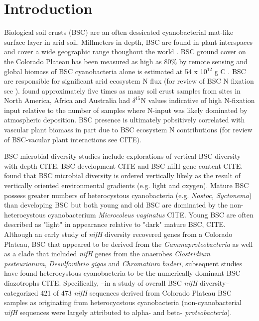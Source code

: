 \section{Introduction}


Biological soil crusts (BSC) are an often dessicated cyanobacterial mat-like surface layer in arid soil. Millmeters in depth, BSC are found in plant interspaces and cover a wide geographic range thoughout the world \cite{garcia2003estimates}. BSC ground cover on the Colorado Plateau has been measured as high as 80\% by remote sensing \cite{karnieli2001} and global biomass of BSC cyanobacteria alone is estimated at 54 x 10$^{12}$ g C \cite{garcia2003estimates}. BSC are responsible for significant arid ecosystem N flux (for review of BSC N fixation see \citet{belnap2003}). \citet{Evans_1999} found approximately five times as many soil crust samples from sites in North America, Africa and Australia had $\delta^{15}$N values indicative of high N-fixation input relative to the number of samples where N-input was likely dominated by atmospheric deposition. BSC presence is ultimately pobsitively correlated with vascular plant biomass in part due to BSC ecosystem N contributions (for review of BSC-vacular plant interactions see CITE).

BSC microbial diversity studies include explorations of vertical BSC diversity with depth CITE, BSC development CITE and BSC nifH gene content CITE. \citet{Garcia_Pichel_2003} found that BSC microbial diversity is ordered vertically likely as the result of vertically oriented environmental gradients (e.g. light and oxygen). Mature BSC possess greater numbers of heterocystous cyanobacteria (e.g. \textit{Nostoc, Syctonema}) than developing BSC but both young and old BSC are dominated by the non-heterocystous cyanobacterium \textit{Microcoleus vaginatus} CITE. Young BSC are often described as "light" in appearance relative to "dark" mature BSC, CITE.  Although an early study of \textit{nifH} diversity recovered genes from a Colorado Plateau, BSC that appeared to be derived from the \textit{Gammaproteobacteria} as well as a clade that included \textit{nifH} genes from the anaerobes \textit{Clostridium pssteurianum}, \textit{Desulfovibrio gigas} and \textit{Chromatium buderi}, subsequent studies have found heterocystous cyanobacteria to be the numerically dominant BSC diazotrophs CITE. Specifically, \citet{Yeager}--in a study of overall BSC \textit{nifH} diversity--categorized 421 of 473 \textit{nifH} sequences derived from Colorado Plateau BSC samples as originating from heterocycstous cyanobacteria (non-cyanobacterial \textit{nifH} sequences were largely attributed to alpha- and beta- \textit{proteobacteria}).

